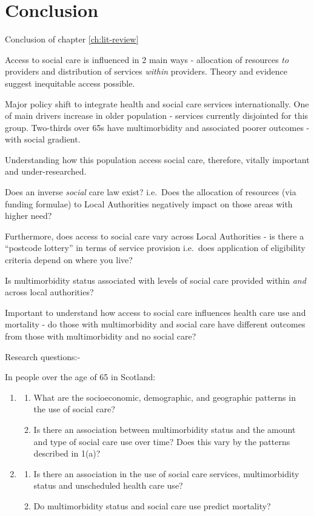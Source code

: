 \documentclass[12pt,]{report}
\providecommand{\tightlist}{%
  \setlength{\itemsep}{0pt}\setlength{\parskip}{0pt}}
\begin{document}
\section{Conclusion}\label{sec:lit-review-conclusion}

Conclusion of chapter \ref{ch:lit-review}

Access to social care is influenced in 2 main ways - allocation of
resources \emph{to} providers and distribution of services \emph{within}
providers. Theory and evidence suggest inequitable access possible.

Major policy shift to integrate health and social care services
internationally. One of main drivers increase in older population -
services currently disjointed for this group. Two-thirds over 65s have
multimorbidity and associated poorer outcomes - with social gradient.

Understanding how this population access social care, therefore, vitally
important and under-researched.

Does an inverse \emph{social} care law exist? i.e.~Does the allocation
of resources (via funding formulae) to Local Authorities negatively
impact on those areas with higher need?

Furthermore, does access to social care vary across Local Authorities -
is there a ``postcode lottery'' in terms of service provision i.e.~does
application of eligibility criteria depend on where you live?

Is multimorbidity status associated with levels of social care provided
within \emph{and} across local authorities?

Important to understand how access to social care influences health care
use and mortality - do those with multimorbidity and social care have
different outcomes from those with multimorbidity and no social care?

Research questions:-

In people over the age of 65 in Scotland:

\begin{enumerate}
\def\labelenumi{\arabic{enumi}.}
\item
  \begin{enumerate}
  \def\labelenumii{\alph{enumii}.}
  \tightlist
  \item
    What are the socioeconomic, demographic, and geographic patterns in
    the use of social care?
  \item
    Is there an association between multimorbidity status and the amount
    and type of social care use over time? Does this vary by the
    patterns described in 1(a)?
  \end{enumerate}
\item
  \begin{enumerate}
  \def\labelenumii{\alph{enumii}.}
  \tightlist
  \item
    Is there an association in the use of social care services,
    multimorbidity status and unscheduled health care use?
  \item
    Do multimorbidity status and social care use predict mortality?
  \end{enumerate}
\end{enumerate}
\end{document}
